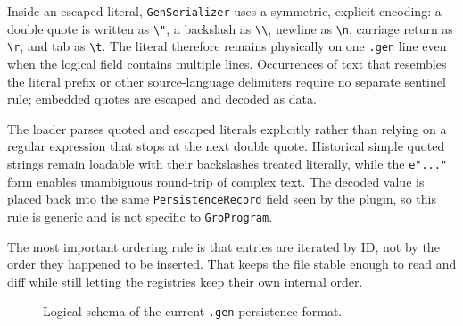 Inside an escaped literal, \texttt{GenSerializer} uses a symmetric, explicit
encoding: a double quote is written as \texttt{\textbackslash{}"}, a backslash
as \texttt{\textbackslash{}\textbackslash{}}, newline as
\texttt{\textbackslash{}n}, carriage return as
\texttt{\textbackslash{}r}, and tab as \texttt{\textbackslash{}t}. The
literal therefore remains physically on one \texttt{.gen} line even when the
logical field contains multiple lines. Occurrences of text that resembles the
literal prefix or other source-language delimiters require no separate sentinel
rule; embedded quotes are escaped and decoded as data.

The loader parses quoted and escaped literals explicitly rather than relying on
a regular expression that stops at the next double quote. Historical simple
quoted strings remain loadable with their backslashes treated literally, while
the \texttt{e"..."} form enables unambiguous round-trip of complex text. The
decoded value is placed back into the same \texttt{PersistenceRecord} field
seen by the plugin, so this rule is generic and is not specific to
\texttt{GroProgram}.

The most important ordering rule is that entries are iterated by ID, not by the
order they happened to be inserted. That keeps the file stable enough to read
and diff while still letting the registries keep their own internal order.

\begin{figure}[htbp]
\centering
\caption{Logical schema of the current \texttt{.gen} persistence format.}
\label{fig:model-persistence-gen-schema}
\end{figure}

